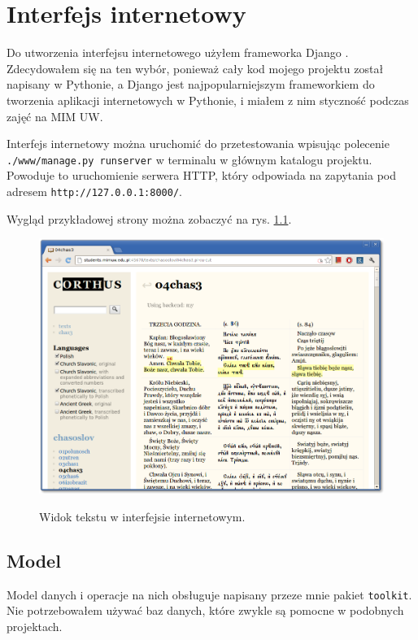 \documentclass{pracamgr}
\begin{document}

\chapter{Interfejs internetowy}\label{r:www}

Do utworzenia interfejsu internetowego użyłem frameworka Django
\cite{django}. Zdecydowałem się na ten wybór, ponieważ cały kod mojego
projektu został napisany w Pythonie, a Django jest najpopularniejszym
frameworkiem do tworzenia aplikacji internetowych w Pythonie, i miałem
z nim styczność podczas zajęć na MIM UW.

Interfejs internetowy można uruchomić do przetestowania wpisując
polecenie {\tt ./www/manage.py runserver} w terminalu w głównym
katalogu projektu. Powoduje to uruchomienie serwera HTTP, który
odpowiada na zapytania pod adresem {\tt http://127.0.0.1:8000/}.

Wygląd przykładowej strony można zobaczyć na rys. \ref{f:web2}.

\begin{figure}[h]
  \caption{Widok tekstu w interfejsie internetowym.}
  \includegraphics[width=\textwidth]{web2.png}
  \label{f:web2}
\end{figure}

\section{Model}

Model danych i operacje na nich obsługuje napisany przeze mnie pakiet
{\tt toolkit}. Nie potrzebowałem używać baz danych, które zwykle są
pomocne w podobnych projektach.
\end{document}
